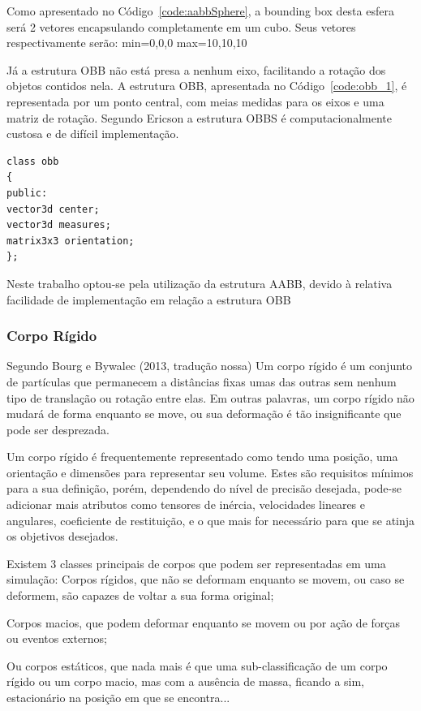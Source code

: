 Como apresentado no Código~\ref{code:aabbSphere}, a bounding box desta esfera será 2 vetores encapsulando completamente em um cubo. Seus vetores respectivamente serão: min=0,0,0 max=10,10,10

Já a estrutura OBB não está presa a nenhum eixo, facilitando a rotação dos objetos contidos nela. A estrutura OBB, apresentada no Código~\ref{code:obb_1},  é representada por um ponto central, com meias medidas para os eixos e uma matriz de rotação. Segundo Ericson a estrutura OBBS é computacionalmente custosa e de difícil implementação.

\begin{lstlisting}[frame=single,caption=Código de exemplo de OBB\label{code:obb_1}]
class obb
{
public:
vector3d center;
vector3d measures;
matrix3x3 orientation;
};
\end{lstlisting}

Neste trabalho optou-se pela utilização da estrutura AABB, devido à relativa facilidade de implementação em relação a estrutura OBB

\subsubsection{Corpo Rígido}
Segundo Bourg e Bywalec (2013, tradução nossa) Um corpo rígido é um conjunto de partículas  que permanecem a distâncias fixas umas das outras  sem nenhum tipo de translação ou rotação entre elas. Em outras palavras,  um corpo rígido não mudará de forma enquanto se move, ou sua deformação é tão insignificante que pode ser desprezada.

Um corpo rígido é  frequentemente representado como tendo uma posição, uma orientação  e  dimensões para representar seu volume. Estes são requisitos mínimos para a  sua definição, porém, dependendo do nível de precisão desejada, pode-se adicionar mais atributos como tensores de inércia, velocidades lineares e angulares, coeficiente de restituição, e o que mais for necessário para que se atinja os objetivos desejados.

Existem 3 classes principais de corpos que podem ser representadas em uma simulação:
Corpos rígidos, que não se deformam  enquanto se movem, ou caso se deformem, são capazes de voltar a sua forma original;


Corpos macios, que podem deformar enquanto se movem ou por ação de forças ou eventos externos;

Ou corpos estáticos, que nada mais é que uma sub-classificação de um corpo rígido ou um corpo macio,  mas com a ausência de massa, ficando a sim, estacionário na posição em que se
encontra...

